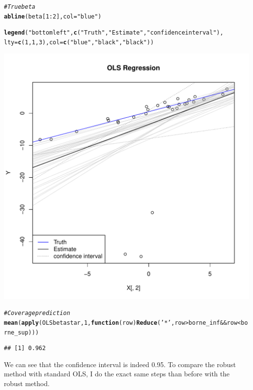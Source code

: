\documentclass[11pt]{article}\usepackage[]{graphicx}\usepackage[]{color}
\makeatletter
\def\maxwidth{ %
  \ifdim\Gin@nat@width>\linewidth
    \linewidth
  \else
    \Gin@nat@width
  \fi
}
\newcommand{\hlnum}[1]{\textcolor[rgb]{0.686,0.059,0.569}{#1}}%
\newcommand{\hlstr}[1]{\textcolor[rgb]{0.192,0.494,0.8}{#1}}%
\newcommand{\hlcom}[1]{\textcolor[rgb]{0.678,0.584,0.686}{\textit{#1}}}%
\newcommand{\hlopt}[1]{\textcolor[rgb]{0,0,0}{#1}}%
\newcommand{\hlstd}[1]{\textcolor[rgb]{0.345,0.345,0.345}{#1}}%
\newcommand{\hlkwa}[1]{\textcolor[rgb]{0.161,0.373,0.58}{\textbf{#1}}}%
\newcommand{\hlkwc}[1]{\textcolor[rgb]{0.333,0.667,0.333}{#1}}%
\newcommand{\hlkwd}[1]{\textcolor[rgb]{0.737,0.353,0.396}{\textbf{#1}}}%
\newenvironment{kframe}{%
 \def\at@end@of@kframe{}%
 \ifinner\ifhmode%
  \def\at@end@of@kframe{\end{minipage}}%
  \begin{minipage}{\columnwidth}%
 \fi\fi%
 \def\FrameCommand##1{\hskip\@totalleftmargin \hskip-\fboxsep
 \colorbox{shadecolor}{##1}\hskip-\fboxsep
     \hskip-\linewidth \hskip-\@totalleftmargin \hskip\columnwidth}%
 \MakeFramed {\advance\hsize-\width
   \@totalleftmargin\z@ \linewidth\hsize
   \@setminipage}}%
 {\par\unskip\endMakeFramed%
 \at@end@of@kframe}
\newenvironment{knitrout}{}{} %
\makeatother
\begin{document}
\begin{knitrout}
\begin{kframe}
\begin{alltt}
\hlcom{# True beta}
\hlkwd{abline}\hlstd{(beta[}\hlnum{1}\hlopt{:}\hlnum{2}\hlstd{],}\hlkwc{col}\hlstd{=}\hlstr{"blue"}\hlstd{)}

\hlkwd{legend}\hlstd{(}\hlstr{"bottomleft"}\hlstd{,}\hlkwd{c}\hlstd{(}\hlstr{"Truth"}\hlstd{,}\hlstr{"Estimate"}\hlstd{,}\hlstr{"confidence interval"}\hlstd{),}
       \hlkwc{lty}\hlstd{=}\hlkwd{c}\hlstd{(}\hlnum{1}\hlstd{,}\hlnum{1}\hlstd{,}\hlnum{3}\hlstd{),}\hlkwc{col}\hlstd{=}\hlkwd{c}\hlstd{(}\hlstr{"blue"}\hlstd{,}\hlstr{"black"}\hlstd{,}\hlstr{"black"}\hlstd{))}
\end{alltt}
\end{kframe}
\includegraphics[width=\maxwidth]{figure/unnamed-chunk-2-1} 
\begin{kframe}\begin{alltt}
\hlcom{# Coverage prediction}
\hlkwd{mean}\hlstd{(}\hlkwd{apply}\hlstd{(OLSbetastar,}\hlnum{1}\hlstd{,}\hlkwa{function}\hlstd{(}\hlkwc{row}\hlstd{)} \hlkwd{Reduce}\hlstd{(}\hlstr{'*'}\hlstd{,row}\hlopt{>}\hlstd{borne_inf} \hlopt{&&} \hlstd{row}\hlopt{<}\hlstd{borne_sup)))}
\end{alltt}
\begin{verbatim}
## [1] 0.962
\end{verbatim}
\end{kframe}
\end{knitrout}
We can see that the confidence interval is indeed 0.95.
To compare the robust method with standard OLS, I do the exact same steps than before with the robust method.
\end{document}
